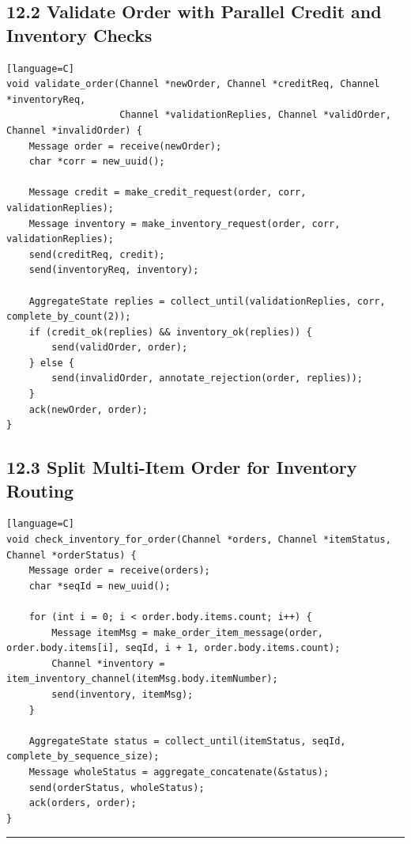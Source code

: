 \documentclass[11pt]{article}
\begin{document}
\subsection{12.2 Validate Order with Parallel Credit and Inventory
Checks}\label{validate-order-with-parallel-credit-and-inventory-checks}

\begin{verbatim}[language=C]
void validate_order(Channel *newOrder, Channel *creditReq, Channel *inventoryReq,
                    Channel *validationReplies, Channel *validOrder, Channel *invalidOrder) {
    Message order = receive(newOrder);
    char *corr = new_uuid();

    Message credit = make_credit_request(order, corr, validationReplies);
    Message inventory = make_inventory_request(order, corr, validationReplies);
    send(creditReq, credit);
    send(inventoryReq, inventory);

    AggregateState replies = collect_until(validationReplies, corr, complete_by_count(2));
    if (credit_ok(replies) && inventory_ok(replies)) {
        send(validOrder, order);
    } else {
        send(invalidOrder, annotate_rejection(order, replies));
    }
    ack(newOrder, order);
}
\end{verbatim}

\subsection{12.3 Split Multi-Item Order for Inventory
Routing}\label{split-multi-item-order-for-inventory-routing}

\begin{verbatim}[language=C]
void check_inventory_for_order(Channel *orders, Channel *itemStatus, Channel *orderStatus) {
    Message order = receive(orders);
    char *seqId = new_uuid();

    for (int i = 0; i < order.body.items.count; i++) {
        Message itemMsg = make_order_item_message(order, order.body.items[i], seqId, i + 1, order.body.items.count);
        Channel *inventory = item_inventory_channel(itemMsg.body.itemNumber);
        send(inventory, itemMsg);
    }

    AggregateState status = collect_until(itemStatus, seqId, complete_by_sequence_size);
    Message wholeStatus = aggregate_concatenate(&status);
    send(orderStatus, wholeStatus);
    ack(orders, order);
}
\end{verbatim}

\begin{center}\rule{0.5\linewidth}{0.5pt}\end{center}
\end{document}
